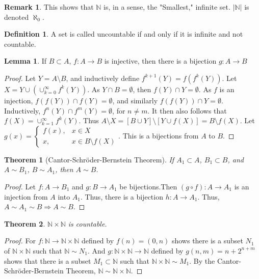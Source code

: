 \documentclass[oneside]{book}
\newtheorem{theorem}{Theorem}[section]
\theoremstyle{definition}
\newtheorem{definition}{Definition}[section]
\newtheorem{lemma}{Lemma}[section]
\newtheorem{remark}{Remark}[section]
\begin{document}
\begin{remark}
This shows that $\mathbb{N}$ is, in a sense, the "Smallest," infinite set. $|\mathbb{N}|$ is denoted $\aleph_0$.
\end{remark}

\begin{definition}
A set is called uncountable if and only if it is infinite and not countable.
\end{definition}

\begin{lemma}
If $B\subset A$, $f:A\rightarrow B$ is injective, then there is a bijection $g:A\rightarrow B$
\end{lemma}
\begin{proof}
Let $Y = A\setminus B$, and inductively define $f^{k+1}(Y) = f(f^{k}(Y))$. Let $X = Y\cup (\cup_{k=0}^{\infty} f^{k}(Y))$. As $Y\cap B = \emptyset$, then $f(Y)\cap Y= \emptyset$. As $f$ is an injection, $f(f(Y))\cap f(Y)=\emptyset$, and similarly $f(f(Y))\cap Y = \emptyset$. Inductively, $f^{n}(Y)\cap f^{m}(Y) = \emptyset$, for $n\ne m$. It then also follows that $f(X) = \cup_{k=1}^{\infty} f^{k}(Y)$. Thus $A\setminus X = [B\cup Y]\setminus [Y\cup f(X)] = B\setminus f(X)$. Let $g(x) = \begin{cases} f(x), & x\in X \\ x, & x \in B\setminus f(X)\end{cases}$. This is a bijections from $A$ to $B$.
\end{proof}

\begin{theorem}[Cantor-Schr\"{o}der-Bernstein Theorem]
If $A_1 \subset A$, $B_1 \subset B$, and $A\sim B_1$, $B \sim A_1$, then $A\sim B$.
\end{theorem}
\begin{proof}
Let $f:A\rightarrow B_1$ and $g:B\rightarrow A_1$ be bijections.Then $(g\circ f):A\rightarrow A_1$ is an injection from $A$ into $A_1$. Thus, there is a bijection $h:A\rightarrow A_1$. Thus, $A\sim A_1 \sim B\Rightarrow A\sim B$.
\end{proof}

\begin{theorem}
$\mathbb{N}\times \mathbb{N}$ is countable.
\end{theorem}
\begin{proof}
For $f:\mathbb{N} \rightarrow \mathbb{N}\times \mathbb{N}$ defined by $f(n) = (0,n)$ shows there is a subset $N_1$ of $\mathbb{N} \times \mathbb{N}$ such that $\mathbb{N}\sim N_1$. And $g:\mathbb{N}\times \mathbb{N} \rightarrow \mathbb{N}$ defined by $g(n,m) =n+2^{n+m}$ shows that there is a subset $M_1 \subset \mathbb{N}$ such that $\mathbb{N} \times \mathbb{N} \sim M_1$. By the Cantor-Schr\"{o}der-Bernstein Theorem, $\mathbb{N} \sim \mathbb{N}\times \mathbb{N}$.
\end{proof}
\end{document}
